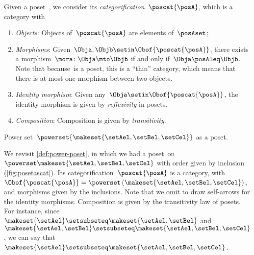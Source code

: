 \begin{ctdefinition}\label{def:poscat}
    Given a poset~\posA, we consider its \emph{categorification}~$\poscat{\posA}$, which is a category with
    \begin{enumerate}
        \item \emph{Objects}: Objects of~$\poscat{\posA}$ are elements of~$\posAset$;
        \item \emph{Morphisms}: Given~$\Obja,\Objb\setin \Obof{\poscat{\posA}}$, there exists a morphism~$\mora\colon \Obja\mto \Objb$ if and only if~$\Obja \posAleq \Objb$.
              Note that because~\posA is a poset, this is a ``thin'' category, which means that there is at most one morphism between two objects.
        \item \emph{Identity morphism}: Given any~$\Obja \setin \Obof{\poscat{\posA}}$, the identity morphism is given by \emph{reflexivity} in posets.
        \item \emph{Composition}: Composition is given by \emph{transitivity}.
    \end{enumerate}
\end{ctdefinition}

\begin{marginfigure}
    \centering
    \caption{Power set~$\powerset{\makeset{\setAel,\setBel,\setCel}}$ as a poset. \label{fig:posetascat}}
\end{marginfigure}

\begin{example}
    We revisit \cref{def:power-poset}, in which we had a poset~\posA on $\powerset \makeset{\setAel,\setBel,\setCel}$ with order given by inclusion (\cref{fig:posetascat}).
    Its categorification~$\poscat{\posA}$ is a category, with $\Obof{\poscat{\posA}}=\powerset\left(\makeset{\setAel,\setBel,\setCel}\right)$, and morphisms given by the inclusions.
    Note that we omit to draw self-arrows for the identity morphisms.
    Composition is given by the transitivity law of posets.
    For instance, since~$\makeset{\setAel}\setsubseteq \makeset{\setAel,\setBel}$ and~$\makeset{\setAel,\setBel} \setsubseteq \makeset{\setAel,\setBel,\setCel}$, we can say that~$\makeset{\setAel}\setsubseteq \makeset{\setAel,\setBel,\setCel}$.
\end{example}


